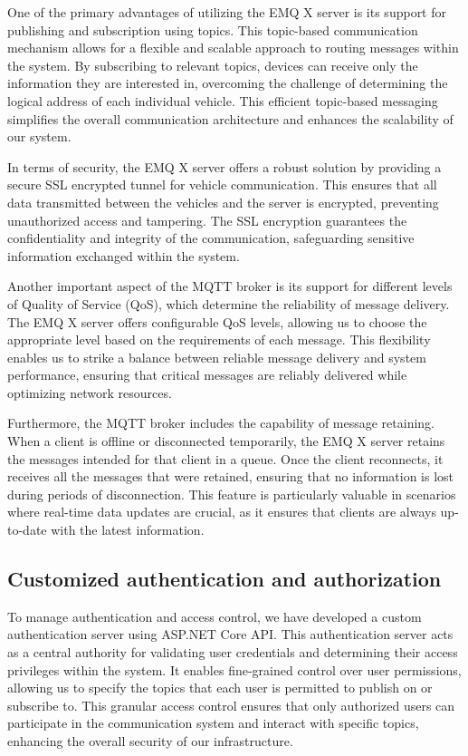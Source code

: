 \documentclass[
12pt,
oneside, 
onehalfspacing, 
nolistspacing, 
parskip, 
chapterinoneline, 
]{AASTCOMPUTER}
\begin{document}
One of the primary advantages of utilizing the EMQ X server is its support for publishing and subscription using topics. This topic-based communication mechanism allows for a flexible and scalable approach to routing messages within the system. By subscribing to relevant topics, devices can receive only the information they are interested in, overcoming the challenge of determining the logical address of each individual vehicle. This efficient topic-based messaging simplifies the overall communication architecture and enhances the scalability of our system.



In terms of security, the EMQ X server offers a robust solution by providing a secure SSL encrypted tunnel for vehicle communication. This ensures that all data transmitted between the vehicles and the server is encrypted, preventing unauthorized access and tampering. The SSL encryption guarantees the confidentiality and integrity of the communication, safeguarding sensitive information exchanged within the system.

Another important aspect of the MQTT broker is its support for different levels of Quality of Service (QoS), which determine the reliability of message delivery. The EMQ X server offers configurable QoS levels, allowing us to choose the appropriate level based on the requirements of each message. This flexibility enables us to strike a balance between reliable message delivery and system performance, ensuring that critical messages are reliably delivered while optimizing network resources.

Furthermore, the MQTT broker includes the capability of message retaining. When a client is offline or disconnected temporarily, the EMQ X server retains the messages intended for that client in a queue. Once the client reconnects, it receives all the messages that were retained, ensuring that no information is lost during periods of disconnection. This feature is particularly valuable in scenarios where real-time data updates are crucial, as it ensures that clients are always up-to-date with the latest information.
\subsection{Customized authentication and authorization}
To manage authentication and access control, we have developed a custom authentication server using ASP.NET Core API. This authentication server acts as a central authority for validating user credentials and determining their access privileges within the system. It enables fine-grained control over user permissions, allowing us to specify the topics that each user is permitted to publish on or subscribe to. This granular access control ensures that only authorized users can participate in the communication system and interact with specific topics, enhancing the overall security of our infrastructure.
\end{document}
